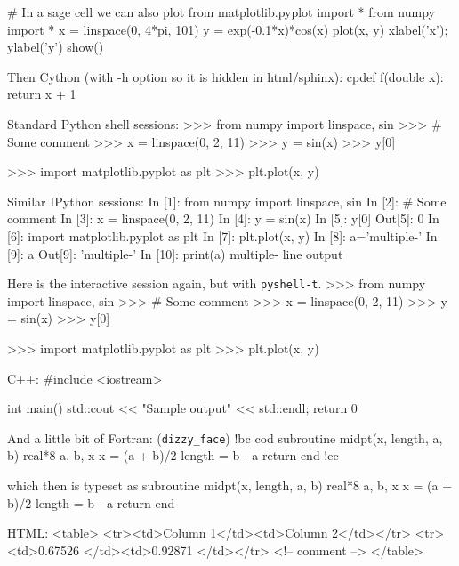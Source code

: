 \documentclass[%
oneside,                 %
final,                   %
10pt]{article}
\theoremstyle{definition}
\begin{document}
# In a sage cell we can also plot
from matplotlib.pyplot import *
from numpy import *
x = linspace(0, 4*pi, 101)
y = exp(-0.1*x)*cos(x)
plot(x, y)
xlabel('x'); ylabel('y')
show()

\epypro

Then Cython (with -h option so it is hidden in html/sphinx):
\bcycod
cpdef f(double x):
    return x + 1

\ecycod

Standard Python shell sessions:
\bpyshell
>>> from numpy import linspace, sin
>>> # Some comment
>>> x = linspace(0, 2, 11)
>>> y = sin(x)
>>> y[0]

>>> import matplotlib.pyplot as plt
>>> plt.plot(x, y)

\epyshell

Similar IPython sessions:
\bipy
In [1]: from numpy import linspace, sin
In [2]: # Some comment
In [3]: x = linspace(0, 2, 11)
In [4]: y = sin(x)
In [5]: y[0]
Out[5]: 0
In [6]: import matplotlib.pyplot as plt
In [7]: plt.plot(x, y)
In [8]: a='multiple-\nline\noutput'
In [9]: a
Out[9]: 'multiple-\nline\noutput'
In [10]: print(a)
multiple-
line
output

\eipy

Here is the interactive session again, but with \texttt{pyshell-t}.
\bpyshell
>>> from numpy import linspace, sin
>>> # Some comment
>>> x = linspace(0, 2, 11)
>>> y = sin(x)
>>> y[0]

>>> import matplotlib.pyplot as plt
>>> plt.plot(x, y)

\epyshell

C++:
\bcpppro
#include <iostream>

int main()
{
   std::cout << "Sample output" << std::endl;
   return 0
}

\ecpppro

And a little bit of Fortran: (\Verb!dizzy_face!)
\bdo
!bc cod
      subroutine midpt(x, length, a, b)
      real*8 a, b, x
      x = (a + b)/2
      length = b - a
      return
      end
!ec

\edo

which then is typeset as
\bcod
      subroutine midpt(x, length, a, b)
      real*8 a, b, x
      x = (a + b)/2
      length = b - a
      return
      end

\ecod

HTML:
\bhtmlcod
<table>
<tr><td>Column 1</td><td>Column 2</td></tr>
<tr><td>0.67526 </td><td>0.92871 </td></tr>
<!-- comment -->
</table>
\end{document}
